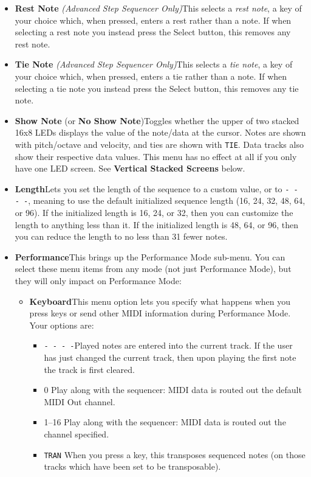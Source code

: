 \documentclass{article}
\begin{document}
\begin{itemize}
\item {\bf Rest Note} {\it (Advanced Step Sequencer Only)}\quad This selects a {\it rest note}, a key of your choice which, when pressed, enters a rest rather than a note.  If when selecting a rest note you instead press the Select button, this removes any rest note. 

\item {\bf Tie Note} {\it (Advanced Step Sequencer Only)}\quad This selects a {\it tie note}, a key of your choice which, when pressed, enters a tie rather than a note.  If when selecting a tie note you instead press the Select button, this removes any tie note. 

\item {\bf Show Note}  (or {\bf No Show Note})\quad  Toggles whether the upper of two stacked 16x8 LEDs displays the value of the note/data at the cursor.  Notes are shown with pitch/octave and velocity, and ties are shown with \texttt{TIE}.  Data tracks also show their respective data values.  This menu has no effect at all if you only have one LED screen.  See {\bf Vertical Stacked Screens} below.

\item {\bf Length}\quad  Lets you set the length of the sequence to a custom value, or to \texttt{- - - -}, meaning to use the default initialized sequence length (16, 24, 32, 48, 64, or 96).  If the initialized length is 16, 24, or 32, then you can customize the length to anything less than it.  If the initialized length is 48, 64, or 96, then you can reduce the length to no less than 31 fewer notes.

\item {\bf Performance}\quad  This brings up the Performance Mode sub-menu.  You can select these menu items from any mode (not just Performance Mode), but they will only impact on Performance Mode:

\begin{itemize}
\item {\bf Keyboard}\quad  This menu option lets you specify what happens when you press keys or send other MIDI information during Performance Mode.  Your options are:

 \renewcommand\labelitemiii{$\diamond$}
\begin{itemize}
	\item {\texttt{-~-~-~-}}\quad Played notes are entered into the current track.  If the user has just changed the current track, then upon playing the first note the track is first cleared.
	\item {0} \quad Play along with the sequencer: MIDI data is routed out the default MIDI Out channel.
	\item {1--16} \quad Play along with the sequencer: MIDI data is routed out the channel specified.
	\item {\texttt{TRAN}} \quad When you press a key, this transposes sequenced notes (on those tracks which have been set to be transposable).
\end{itemize}


\end{itemize}
\end{itemize}
\end{document}
